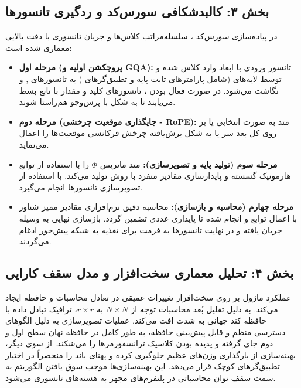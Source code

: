\subsection*{بخش ۳: کالبدشکافی سورس‌کد و ردگیری تانسورها }
در پیاده‌سازی سورس‌کد ، سلسله‌مراتب کلاس‌ها و جریان تانسوری با دقت بالایی معماری شده است:
\begin{itemize}
    \item \textbf{مرحله اول (پروجکشن اولیه و GQA):} تانسور ورودی با ابعاد \lr{$[B, N, D]$} وارد کلاس  شده و توسط لایه‌های  (شامل پارامترهای ثابت پایه و تطبیق‌گرهای ) به تانسورهای ,  و  نگاشت می‌شود. در صورت فعال بودن ، تانسورهای کلید و مقدار با تابع  بسط می‌یابند تا به شکل \lr{$[B, H, N, d]$} با پرس‌وجو هم‌راستا شوند.
    \item \textbf{مرحله دوم (جایگذاری موقعیت چرخشی - RoPE):} متد  به صورت انتخابی یا بر روی کل بعد سر یا به شکل برش‌یافته  چرخش فرکانسی موقعیت‌ها را اعمال می‌نماید.
    \item \textbf{مرحله سوم (تولید پایه و تصویرسازی):} متد  ماتریس $\Phi$ را با استفاده از توابع هارمونیک گسسته و پایدارسازی مقادیر منفرد با روش  تولید می‌کند. با استفاده از  تصویرسازی تانسورها انجام می‌گیرد.
    \item \textbf{مرحله چهارم (محاسبه و بازسازی):} محاسبه دقیق نرم‌افزاری مقادیر ممیز شناور  با اعمال توابع  و  انجام شده تا پایداری عددی تضمین گردد. بازسازی نهایی به وسیله  جریان یافته و در نهایت تانسورها به فرمت \lr{$[B, N, D]$} برای تغذیه به شبکه پیش‌خور ادغام می‌گردند.
\end{itemize}

\subsection*{بخش ۴: تحلیل معماری سخت‌افزار و مدل سقف کارایی }
عملکرد ماژول بر روی سخت‌افزار  تغییرات عمیقی در تعادل محاسبات و حافظه ایجاد می‌کند. 
به دلیل تقلیل بُعد محاسبات توجه از $N \times N$ به $r \times r$، ترافیک تبادل داده با حافظه کند جهانی  به شدت افت می‌کند. عملیات تصویرسازی  به دلیل الگوهای دسترسی منظم و قابل پیش‌بینی حافظه، به طور کامل در حافظه نهان سطح اول و دوم  جای گرفته و پدیده  بودن کلاسیک ترانسفورمرها را می‌شکند. از سوی دیگر، بهینه‌سازی  از بارگذاری وزن‌های عظیم جلوگیری کرده و پهنای باند را منحصراً در اختیار تطبیق‌گرهای کوچک  قرار می‌دهد. این بهینه‌سازی‌ها موجب سوق یافتن الگوریتم به سمت سقف توان محاسباتی  در پلتفرم‌های مجهز به هسته‌های تانسوری می‌شود.

